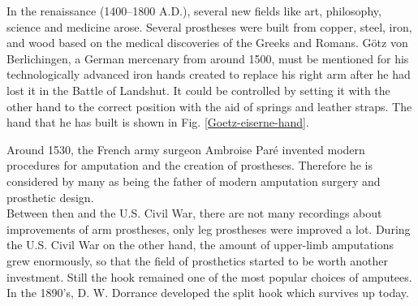 \documentclass[main]{subfiles}
\begin{document}
\begin{figure}[htp]
\hspace{0.15\textwidth}
\end{figure}

In the renaissance (1400--1800 A.D.), several new fields like art, philosophy, science and medicine arose. Several prostheses were built from copper, steel, iron, and wood based on the medical discoveries of the Greeks and Romans. Götz von Berlichingen, a German mercenary from around 1500, must be mentioned for his technologically advanced iron hands created to replace his right arm after he had lost it in the Battle of Landshut. It could be controlled by setting it with the other hand to the correct position with the aid of springs and leather straps. The hand that he has built is shown in Fig. \ref{Goetz-eiserne-hand}.

Around 1530, the French army surgeon Ambroise Par\'{e} invented modern procedures for amputation and the creation of prostheses. Therefore he is considered by many as being the father of modern amputation surgery and prosthetic design.\\ Between then and the U.S. Civil War, there are not many recordings about improvements of arm prostheses, only leg prostheses were improved a lot. During the U.S. Civil War on the other hand, the amount of upper-limb amputations grew enormously, so that the field of prosthetics started to be worth another investment. Still the hook remained one of the most popular choices of amputees. In the 1890's, D. W. Dorrance developed the split hook which survives up today. 

\begin{figure}[H]
\hspace{0.15\textwidth}
\\
\end{figure}
\end{document}
